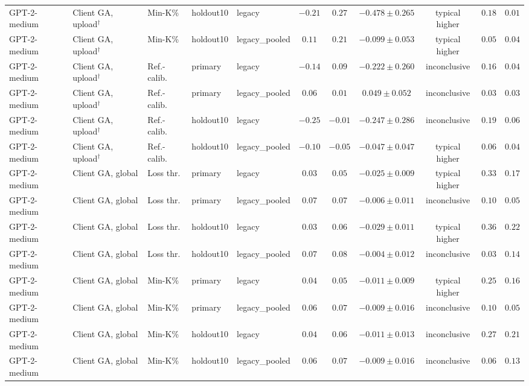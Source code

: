 {\begin{longtable}{@{\extracolsep{\fill}}lllllcccccc@{}}
GPT-2-medium & Client GA, upload$^{\dagger}$ & Min-K\% & holdout10 & legacy & $-0.21$ & $0.27$ & $-0.478 \pm 0.265$ & typical higher & $0.18$ & $0.01$ \\
GPT-2-medium & Client GA, upload$^{\dagger}$ & Min-K\% & holdout10 & legacy\_pooled & $0.11$ & $0.21$ & $-0.099 \pm 0.053$ & typical higher & $0.05$ & $0.04$ \\
GPT-2-medium & Client GA, upload$^{\dagger}$ & Ref.-calib. & primary & legacy & $-0.14$ & $0.09$ & $-0.222 \pm 0.260$ & inconclusive & $0.16$ & $0.04$ \\
GPT-2-medium & Client GA, upload$^{\dagger}$ & Ref.-calib. & primary & legacy\_pooled & $0.06$ & $0.01$ & $0.049 \pm 0.052$ & inconclusive & $0.03$ & $0.03$ \\
GPT-2-medium & Client GA, upload$^{\dagger}$ & Ref.-calib. & holdout10 & legacy & $-0.25$ & $-0.01$ & $-0.247 \pm 0.286$ & inconclusive & $0.19$ & $0.06$ \\
GPT-2-medium & Client GA, upload$^{\dagger}$ & Ref.-calib. & holdout10 & legacy\_pooled & $-0.10$ & $-0.05$ & $-0.047 \pm 0.047$ & typical higher & $0.06$ & $0.04$ \\
GPT-2-medium & Client GA, global & Loss thr. & primary & legacy & $0.03$ & $0.05$ & $-0.025 \pm 0.009$ & typical higher & $0.33$ & $0.17$ \\
GPT-2-medium & Client GA, global & Loss thr. & primary & legacy\_pooled & $0.07$ & $0.07$ & $-0.006 \pm 0.011$ & inconclusive & $0.10$ & $0.05$ \\
GPT-2-medium & Client GA, global & Loss thr. & holdout10 & legacy & $0.03$ & $0.06$ & $-0.029 \pm 0.011$ & typical higher & $0.36$ & $0.22$ \\
GPT-2-medium & Client GA, global & Loss thr. & holdout10 & legacy\_pooled & $0.07$ & $0.08$ & $-0.004 \pm 0.012$ & inconclusive & $0.03$ & $0.14$ \\
GPT-2-medium & Client GA, global & Min-K\% & primary & legacy & $0.04$ & $0.05$ & $-0.011 \pm 0.009$ & typical higher & $0.25$ & $0.16$ \\
GPT-2-medium & Client GA, global & Min-K\% & primary & legacy\_pooled & $0.06$ & $0.07$ & $-0.009 \pm 0.016$ & inconclusive & $0.10$ & $0.05$ \\
GPT-2-medium & Client GA, global & Min-K\% & holdout10 & legacy & $0.04$ & $0.06$ & $-0.011 \pm 0.013$ & inconclusive & $0.27$ & $0.21$ \\
GPT-2-medium & Client GA, global & Min-K\% & holdout10 & legacy\_pooled & $0.06$ & $0.07$ & $-0.009 \pm 0.016$ & inconclusive & $0.06$ & $0.13$ \\

\end{longtable}}
